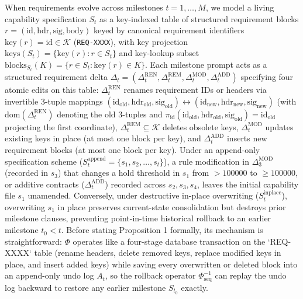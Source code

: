 \documentclass[11pt,a4paper,copyright]{google}
\begin{document}
When requirements evolve across milestones $t = 1, \dots, M$, we model a living capability specification $S_t$ as a key-indexed table of structured requirement blocks $r = (\text{id}, \text{hdr}, \text{sig}, \text{body})$ keyed by canonical requirement identifiers $\text{key}(r) = \text{id} \in \mathcal{K}$ (\texttt{REQ-XXXX}), with key projection $\text{keys}(S_t) = \{\text{key}(r) : r \in S_t\}$ and key-lookup subset $\text{blocks}_{S_t}(K) = \{r \in S_t : \text{key}(r) \in K\}$. Each milestone prompt acts as a structured requirement delta $\Delta_t = (\Delta_t^{\text{REN}}, \Delta_t^{\text{REM}}, \Delta_t^{\text{MOD}}, \Delta_t^{\text{ADD}})$ specifying four atomic edits on this table: $\Delta_t^{\text{REN}}$ renames requirement IDs or headers via invertible 3-tuple mappings $(\text{id}_{\text{old}}, \text{hdr}_{\text{old}}, \text{sig}_{\text{old}}) \leftrightarrow (\text{id}_{\text{new}}, \text{hdr}_{\text{new}}, \text{sig}_{\text{new}})$ (with $\text{dom}(\Delta_t^{\text{REN}})$ denoting the old 3-tuples and $\pi_{\text{id}}(\text{id}_{\text{old}}, \text{hdr}_{\text{old}}, \text{sig}_{\text{old}}) = \text{id}_{\text{old}}$ projecting the first coordinate), $\Delta_t^{\text{REM}} \subseteq \mathcal{K}$ deletes obsolete keys, $\Delta_t^{\text{MOD}}$ updates existing keys in place (at most one block per key), and $\Delta_t^{\text{ADD}}$ inserts new requirement blocks (at most one block per key). Under an append-only specification scheme ($S_t^{\text{append}} = \{s_1, s_2, \dots, s_t\}$), a rule modification in $\Delta_3^{\text{MOD}}$ (recorded in $s_3$) that changes a hold threshold in $s_1$ from $> 100000$ to $\ge 100000$, or additive contracts ($\Delta_t^{\text{ADD}}$) recorded across $s_2, s_3, s_4$, leaves the initial capability file $s_1$ unamended. Conversely, under destructive in-place overwriting ($S_t^{\text{inplace}}$), overwriting $s_1$ in place preserves current-state consolidation but destroys prior milestone clauses, preventing point-in-time historical rollback to an earlier milestone $t_0 < t$. Before stating Proposition 1 formally, its mechanism is straightforward: $\Phi$ operates like a four-stage database transaction on the `REQ-XXXX` table (rename headers, delete removed keys, replace modified keys in place, and insert added keys) while saving every overwritten or deleted block into an append-only undo log $A_t$, so the rollback operator $\Phi_{\text{seq}}^{-1}$ can replay the undo log backward to restore any earlier milestone $S_{t_0}$ exactly.
\end{document}
